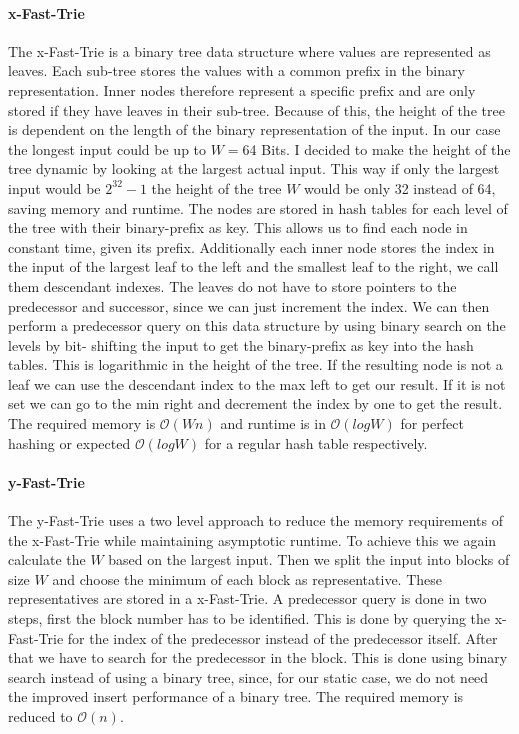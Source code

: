\documentclass[a4paper,UKenglish,cleveref, autoref, thm-restate]{lipics-v2021}
\begin{document}
\paragraph*{x-Fast-Trie} The x-Fast-Trie is a binary tree data structure where values are represented as leaves. Each sub-tree 
stores the values with a common prefix in the binary representation. Inner nodes therefore represent a 
specific prefix and are only stored if they have leaves in their sub-tree. Because of this, the height of 
the tree is dependent on the length of the binary representation of the input. In our case the longest 
input could be up to $W=$64 Bits. I decided to make the height of the tree dynamic by looking at the largest 
actual input. This way if only the largest input would be $2^{32} - 1$ the height of the tree $W$ would be only 
32 instead of 64, saving memory and runtime. The nodes are stored in hash tables for each level of the tree 
with their binary-prefix as key. This allows us to find each node in constant time, given its prefix. 
Additionally each inner node stores the index in the input of the largest leaf to the left and the smallest 
leaf to the right, we call them descendant indexes. The leaves do not have to store pointers to the 
predecessor and successor, since we can just increment the index.
We can then perform a predecessor query on this data structure by using binary search on the levels by bit-
shifting the input to get the binary-prefix as key into the hash tables. This is logarithmic in the height 
of the tree. If the resulting node is not a leaf we can use the descendant index to the max left to get our 
result. If it is not set we can go to the min right and decrement the index by one to get the result. The 
required memory is $\mathcal{O}(Wn)$ and runtime is in $\mathcal{O}(logW)$ for perfect hashing or expected $\mathcal{O}(logW)$ for a regular hash table respectively. 

\paragraph*{y-Fast-Trie} The y-Fast-Trie uses a two level approach to reduce the memory requirements of the x-Fast-Trie while 
maintaining asymptotic runtime. To achieve this we again calculate the $W$ based on the largest input. Then 
we split the input into blocks of size $W$ and choose the minimum of each block as representative. These 
representatives are stored in a x-Fast-Trie. A predecessor query is done in two steps, first the block 
number has to be identified. This is done by querying the x-Fast-Trie for the index of the predecessor 
instead of the predecessor itself. After that we have to search for the predecessor in the block. This is 
done using binary search instead of using a binary tree, since, for our static case, we do not need the 
improved insert performance of a binary tree. The required memory is reduced to $\mathcal{O}(n)$.
\end{document}
